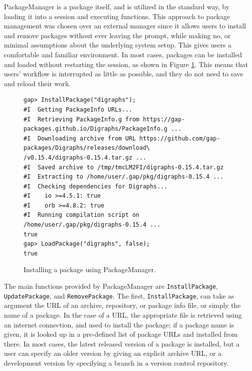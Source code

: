 {\sf PackageManager} is a \GAP package itself, and is utilized in the
standard way, by loading it into a \GAP session and executing \GAP
functions. This approach to package management was chosen over an external
manager since it allows users to install and remove packages without ever
leaving the \GAP prompt, while making no, or minimal assumptions about
the underlying system setup. This gives
users a comfortable and familiar environment. In most cases, packages can be installed
and loaded without restarting the session, as shown in Figure \ref{fig:pkgman-sample-b}.
This means that users' workflow is interrupted as little as possible, and they do
not need to save and reload their work.

\begin{figure}[!ht]
    \centering
    {\tiny
\begin{verbatim}
gap> InstallPackage("digraphs");
#I  Getting PackageInfo URLs...
#I  Retrieving PackageInfo.g from https://gap-packages.github.io/Digraphs/PackageInfo.g ...
#I  Downloading archive from URL https://github.com/gap-packages/Digraphs/releases/download\
/v0.15.4/digraphs-0.15.4.tar.gz ...
#I  Saved archive to /tmp/tmcLM2FI/digraphs-0.15.4.tar.gz
#I  Extracting to /home/user/.gap/pkg/digraphs-0.15.4 ...
#I  Checking dependencies for Digraphs...
#I    io >=4.5.1: true
#I    orb >=4.8.2: true
#I  Running compilation script on /home/user/.gap/pkg/digraphs-0.15.4 ...
true
gap> LoadPackage("digraphs", false);
true
\end{verbatim}
    }
    \caption{Installing a package using {\sf PackageManager}.}
    \label{fig:pkgman-sample-b}
\end{figure}

The main functions provided by {\sf PackageManager} are \texttt{InstallPackage},
\texttt{UpdatePackage}, and \texttt{RemovePackage}.  The first,
\texttt{InstallPackage}, can take as argument the URL of an archive, repository, or package info file, or simply the
name of a package.  In the case of a URL, the appropriate file is retrieved
using an internet connection, and used to install the package; if a package name
is given, it is looked up in a pre-defined list of package URLs and installed
from there.  In most cases, the latest released version of a package is
installed, but a user can specify an older version by giving an explicit archive
URL, or a development version by specifying a branch in a
version control repository.  %

